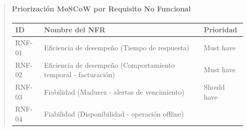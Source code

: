 \documentclass[
]{article}
\newcounter{none} %
\begin{document}
\begin{quote}
\paragraph{Priorización MoSCoW por Requisito No
Funcional}\label{priorizaciuxf3n-moscow-por-requisito-no-funcional}

{\def\LTcaptype{none} %
\begin{longtable}[]{|
  >{\raggedright\arraybackslash}p{}|
  >{\raggedright\arraybackslash}p{}|
  >{\raggedright\arraybackslash}p{}|}
\hline
\begin{minipage}[b]{\linewidth}\centering
\textbf{ID}
\end{minipage} & \begin{minipage}[b]{\linewidth}\raggedright
\textbf{Nombre del NFR}
\end{minipage} & \begin{minipage}[b]{\linewidth}\centering
\textbf{Prioridad}
\end{minipage} \\
\hline
\endhead
\hline
\endlastfoot
RNF-01 & \begin{minipage}[t]{\linewidth}\raggedright
Eficiencia de desempeño (Tiempo de respuesta)
\end{minipage} & \begin{minipage}[t]{\linewidth}\raggedright
Must have
\end{minipage} \\
\hline
RNF-02 & \begin{minipage}[t]{\linewidth}\raggedright
Eficiencia de desempeño (Comportamiento temporal - facturación)
\end{minipage} & \begin{minipage}[t]{\linewidth}\raggedright
Must have
\end{minipage} \\
\hline
RNF-03 & \begin{minipage}[t]{\linewidth}\raggedright
Fiabilidad (Madurez - alertas de vencimiento)
\end{minipage} & \begin{minipage}[t]{\linewidth}\raggedright
Should have
\end{minipage} \\
\hline
RNF-04 & \begin{minipage}[t]{\linewidth}\raggedright
Fiabilidad (Disponibilidad - operación offline)
\end{minipage} & \begin{minipage}[t]{\linewidth}\raggedright

\end{minipage}
\end{longtable}}
\end{quote}
\end{document}
